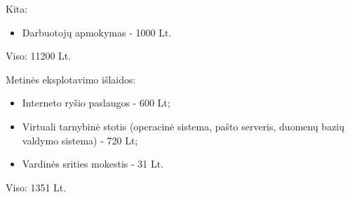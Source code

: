Kita:
\begin{itemize}
  \item Darbuotoj\k{u} apmokymas - 1000 Lt.
\end{itemize}

Viso: 11200 Lt.

Metin\.{e}s eksplotavimo išlaidos:
\begin{itemize}
  \item Interneto ryšio paslaugos - 600 Lt;
  \item Virtuali tarnybin\.{e} stotis (operacin\.{e} sistema, pašto 
    serveris, duomen\k{u} bazi\k{u} valdymo sistema) - 720 Lt;
  \item Vardin\.{e}s srities mokestis - 31 Lt.
\end{itemize}

Viso: 1351 Lt.

